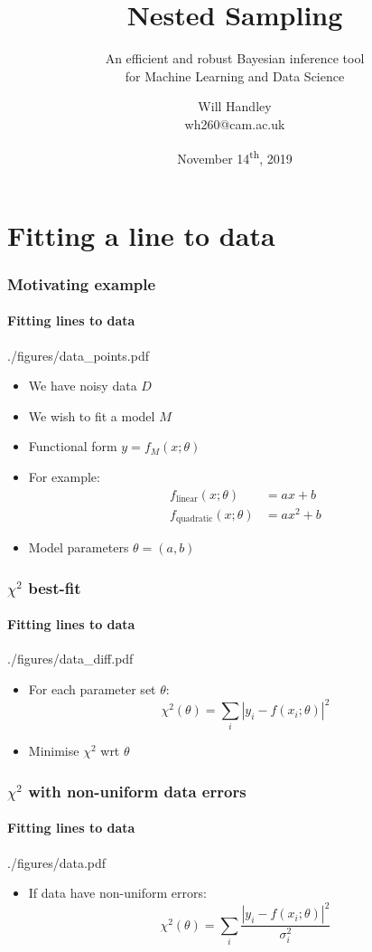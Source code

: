\documentclass[%
]{beamer}
\title{Nested Sampling}
\subtitle{An efficient and robust Bayesian inference tool\\ for Machine Learning and Data Science}
\author[Handley] %
{Will Handley\\ \small{wh260@cam.ac.uk}}
\institute[University of Cambridge] %
{%
Kavli Institute for Cosmology \\
Astrophysics Group \\
Cavendish Laboratory \\
University of Cambridge
}
\date{November 14\textsuperscript{th}, 2019}
\begin{document}
\begin{frame}
  \titlepage
\end{frame}

\section{Fitting a line to data}
\begin{frame}
    \frametitle{Motivating example}
    \framesubtitle{Fitting lines to data}
    \begin{figright}[0.4]{./figures/data_points.pdf}
        \begin{itemize}
            \item We have noisy data $D$
            \item We wish to fit a model $M$
            \item Functional form $y=f_M(x;\theta)$
            \item For example:
                \begin{align}
                     f_\text{linear}(x;\theta)&=a x + b       \nonumber\\
                     f_\text{quadratic}(x;\theta)&=a x^2 + b  \nonumber
                \end{align}
            \item Model parameters $\theta= (a,b)$
        \end{itemize}
    \end{figright}
\end{frame}

\begin{frame}
    \frametitle{$\chi^2$ best-fit}
    \framesubtitle{Fitting lines to data}
    \begin{figright}[0.4]{./figures/data_diff.pdf}
        \begin{itemize}
            \item For each parameter set $\theta$:
                \[
                    \chi^2(\theta) = \sum_i \left|y_i - f(x_i;\theta)\right|^2
                \]
            \item Minimise $\chi^2$ wrt $\theta$
        \end{itemize}
    \end{figright}
\end{frame}

\begin{frame}
    \frametitle{$\chi^2$ with non-uniform data errors}
    \framesubtitle{Fitting lines to data}
    \begin{figright}[0.4]{./figures/data.pdf}
        \begin{itemize}
            \item If data have non-uniform errors:
                \[
                    \chi^2(\theta) = \sum_i \frac{\left|y_i - f(x_i;\theta)\right|^2}{\sigma_i^2}
                \]
        \end{itemize}
    \end{figright}
\end{frame}
\end{document}
